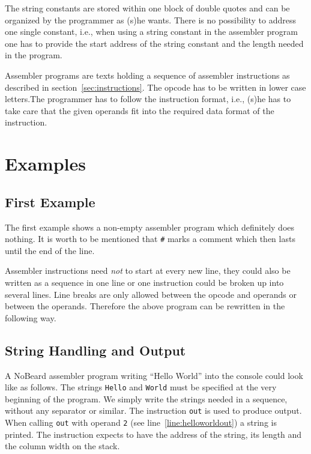 \documentclass[11pt]{report}
\newcommand{\leongage}{NoBeard}
\begin{document}
The string constants are stored within one block of double quotes and can be organized by the programmer as (s)he wants. There is no possibility to address one single constant, i.e., when using a string constant in the assembler program one has to provide the start address of the string constant and the length needed in the program.

Assembler programs are texts holding a sequence of assembler instructions as described in section~\ref{sec:instructions}. The opcode has to be written in lower case letters.The programmer has to follow the instruction format, i.e., (s)he has to take care that the given operands fit into the required data format of the instruction.

\section{Examples}
\subsection{First Example}
The first example shows a non-empty assembler program which definitely does nothing. It is worth to be mentioned that \lstinline$#$ marks a comment which then lasts until the end of the line. 
\newcommand{\assemblerfilepath}{../../NoBeardProject/SamplePrograms/NbAssemblerPrograms/}
\lstset{language=NoBeardAsm}


Assembler instructions need {\em not} to start at every new line, they could also be written as a sequence in one line or one instruction could be broken up into several lines. Line breaks are only allowed between the opcode and operands or between the operands. Therefore the above program can be rewritten in the following way.


\subsection{String Handling and Output}
A \leongage{} assembler program writing ``Hello World'' into the console could look like as follows. The strings \lstinline$Hello$ and \lstinline$World$ must be specified at the very beginning of the program. We simply write the strings needed in a sequence, without any separator or similar. The instruction \lstinline$out$ is used to produce output. When calling \lstinline$out$ with operand \lstinline$2$ (see line~\ref{line:helloworldout}) a string is printed. The instruction expects to have the address of the string, its length and the column width on the stack.
\end{document}
